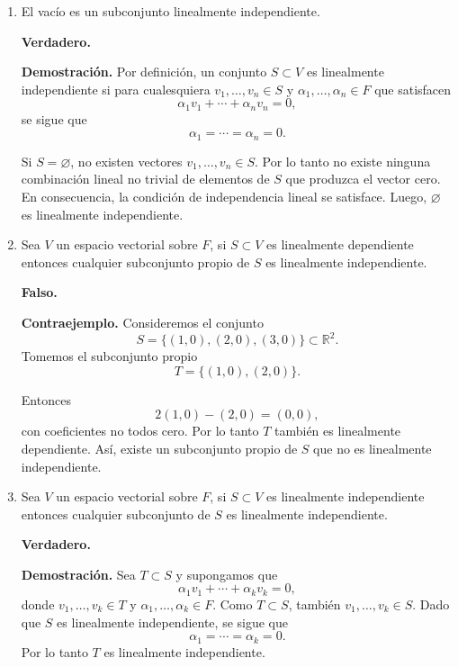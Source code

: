 \documentclass[12pt,a4paper]{article}
\begin{document}
    \begin{solucion}
        \begin{enumerate}
        \item[(a)] El vacío es un subconjunto linealmente independiente.

        \textbf{Verdadero.}

        \textbf{Demostración.}  
        Por definición, un conjunto $S\subset V$ es linealmente independiente si
        para cualesquiera $v_{1},\dots,v_{n}\in S$ y $\alpha_{1},\dots,\alpha_{n}\in F$
        que satisfacen
        \[
        \alpha_{1}v_{1}+\cdots+\alpha_{n}v_{n}=0,
        \]
        se sigue que
        \[
        \alpha_{1}=\cdots=\alpha_{n}=0.
        \]

        Si $S=\varnothing$, no existen vectores $v_{1},\dots,v_{n}\in S$. Por lo
        tanto no existe ninguna combinación lineal no trivial de elementos de
        $S$ que produzca el vector cero. En consecuencia, la condición de
        independencia lineal se satisface. Luego, $\varnothing$ es linealmente independiente.

        \item[(b)] Sea $V$ un espacio vectorial sobre $F$, si $S\subset V$
        es linealmente dependiente entonces cualquier subconjunto propio
        de $S$ es linealmente independiente.

        \textbf{Falso.}

        \textbf{Contraejemplo.}  
        Consideremos el conjunto
        \[
        S=\{(1,0),(2,0),(3,0)\}\subset\mathbb{R}^{2}.
        \]
        Tomemos el subconjunto propio
        \[
        T=\{(1,0),(2,0)\}.
        \]

        Entonces
        \[
        2(1,0)-(2,0)=(0,0),
        \]
        con coeficientes no todos cero. Por lo tanto $T$ también es linealmente
        dependiente. Así, existe un subconjunto propio de $S$ que no es linealmente
        independiente.

        \item[(c)] Sea $V$ un espacio vectorial sobre $F$, si $S\subset V$
        es linealmente independiente entonces cualquier subconjunto
        de $S$ es linealmente independiente.

        \textbf{Verdadero.}

        \textbf{Demostración.}  
        Sea $T\subset S$ y supongamos que
        \[
        \alpha_{1}v_{1}+\cdots+\alpha_{k}v_{k}=0,
        \]
        donde $v_{1},\dots,v_{k}\in T$ y $\alpha_{1},\dots,\alpha_{k}\in F$. Como $T\subset S$, también $v_{1},\dots,v_{k}\in S$. Dado que $S$ es
        linealmente independiente, se sigue que
        \[
        \alpha_{1}=\cdots=\alpha_{k}=0.
        \]
        Por lo tanto $T$ es linealmente independiente.


\end{enumerate}
\end{solucion}
\end{document}
